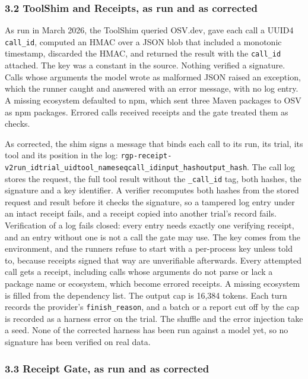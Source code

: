 \documentclass[
]{article}
\begin{document}
\subsubsection{3.2 ToolShim and Receipts, as run and as
corrected}\label{toolshim-and-receipts-as-run-and-as-corrected}

As run in March 2026, the ToolShim queried OSV.dev, gave each call a
UUID4 \texttt{call\_id}, computed an HMAC over a JSON blob that included
a monotonic timestamp, discarded the HMAC, and returned the result with
the \texttt{call\_id} attached. The key was a constant in the source.
Nothing verified a signature. Calls whose arguments the model wrote as
malformed JSON raised an exception, which the runner caught and answered
with an error message, with no log entry. A missing ecosystem defaulted
to npm, which sent three Maven packages to OSV as npm packages. Errored
calls received receipts and the gate treated them as checks.

As corrected, the shim signs a message that binds each call to its run,
its trial, its tool and its position in the log:
\texttt{rgp-receipt-v2\textbar{}run\_id\textbar{}trial\_uid\textbar{}tool\_name\textbar{}seq\textbar{}call\_id\textbar{}input\_hash\textbar{}output\_hash}.
The call log stores the request, the full tool result without the
\texttt{\_call\_id} tag, both hashes, the signature and a key
identifier. A verifier recomputes both hashes from the stored request
and result before it checks the signature, so a tampered log entry under
an intact receipt fails, and a receipt copied into another trial's
record fails. Verification of a log fails closed: every entry needs
exactly one verifying receipt, and an entry without one is not a call
the gate may use. The key comes from the environment, and the runners
refuse to start with a per-process key unless told to, because receipts
signed that way are unverifiable afterwards. Every attempted call gets a
receipt, including calls whose arguments do not parse or lack a package
name or ecosystem, which become errored receipts. A missing ecosystem is
filled from the dependency list. The output cap is 16,384 tokens. Each
turn records the provider's \texttt{finish\_reason}, and a batch or a
report cut off by the cap is recorded as a harness error on the trial.
The shuffle and the error injection take a seed. None of the corrected
harness has been run against a model yet, so no signature has been
verified on real data.

\subsubsection{3.3 Receipt Gate, as run and as
corrected}\label{receipt-gate-as-run-and-as-corrected}
\end{document}
